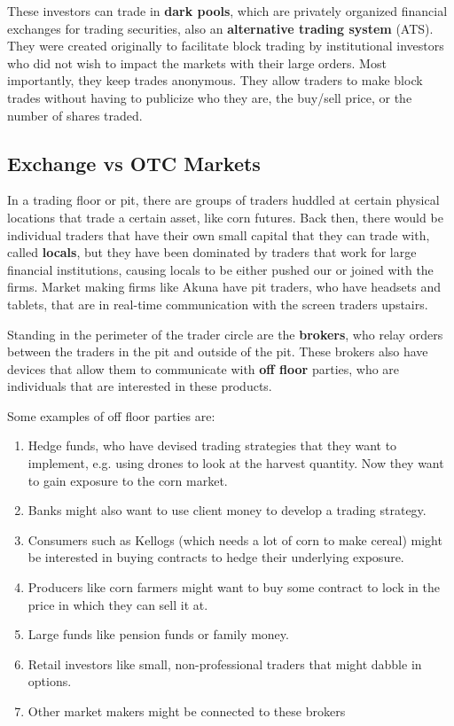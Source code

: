 \documentclass{article}
\begin{document}
    These investors can trade in \textbf{dark pools}, which are privately organized financial exchanges for trading securities, also an \textbf{alternative trading system} (ATS). They were created originally to facilitate block trading by institutional investors who did not wish to impact the markets with their large orders. Most importantly, they keep trades anonymous. They allow traders to make block trades without having to publicize who they are, the buy/sell price, or the number of shares traded. 

  \subsection{Exchange vs OTC Markets}

    In a trading floor or pit, there are groups of traders huddled at certain physical locations that trade a certain asset, like corn futures. Back then, there would be individual traders that have their own small capital that they can trade with, called \textbf{locals}, but they have been dominated by traders that work for large financial institutions, causing locals to be either pushed our or joined with the firms. Market making firms like Akuna have pit traders, who have headsets and tablets, that are in real-time communication with the screen traders upstairs. 

    Standing in the perimeter of the trader circle are the \textbf{brokers}, who relay orders between the traders in the pit and outside of the pit. These brokers also have devices that allow them to communicate with \textbf{off floor} parties, who are individuals that are interested in these products. 

    \begin{example}
      Some examples of off floor parties are: 
      \begin{enumerate}
        \item Hedge funds, who have devised trading strategies that they want to implement, e.g. using drones to look at the harvest quantity. Now they want to gain exposure to the corn market. 
        \item Banks might also want to use client money to develop a trading strategy. 
        \item Consumers such as Kellogs (which needs a lot of corn to make cereal) might be interested in buying contracts to hedge their underlying exposure. 
        \item Producers like corn farmers might want to buy some contract to lock in the price in which they can sell it at. 
        \item Large funds like pension funds or family money. 
        \item Retail investors like small, non-professional traders that might dabble in options.  
        \item Other market makers might be connected to these brokers
      \end{enumerate}
    \end{example}
\end{document}
